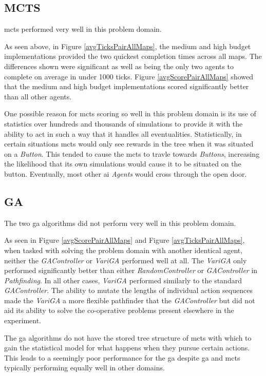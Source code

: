 \documentclass{IEEEtran}
\begin{document}
\subsection{MCTS}
\gls{mcts} performed very well in this problem domain. 

As seen above, in Figure \ref{avgTicksPairAllMaps}, the medium and high budget implementations provided the two quickest completion times across all maps. The differences shown were significant as well as being the only two agents to complete on average in under 1000 ticks.  Figure \ref{avgScorePairAllMaps} showed that the medium and high budget implementations scored significantly better than all other agents.

One possible reason for \gls{mcts} scoring so well in this problem domain is its use of statistics over hundreds and thousands of simulations to provide it with the ability to act in such a way that it handles all eventualities. Statistically,  in certain situations \gls{mcts} would only see rewards in the tree when it was situated on a \emph{Button}. This tended to cause the \gls{mcts} to travle towards \emph{Buttons}, increasing the likelihood that its own simulations would cause it to be situated on the button. Eventually, most other \gls{ai} \emph{Agents} would cross through the open door.
\subsection{GA}
The two \gls{ga} algorithms did not perform very well in this problem domain. 

As seen in Figure \ref{avgScorePairAllMaps} and Figure \ref{avgTicksPairAllMaps}, when tasked with solving the problem domain with another identical agent, neither the \emph{GAController} or \emph{VariGA} performed well at all. The \emph{VariGA} only performed significantly better than either \emph{RandomController} or \emph{GAController} in \emph{Pathfinding}. In all other cases, \emph{VariGA} performed similarly to the standard \emph{GAController}. The ability to mutate the lengths of individual action sequences made the \emph{VariGA} a more flexible pathfinder that the \emph{GAController} but did not aid its ability to solve the co-operative problems present elsewhere in the experiment.

The \gls{ga} algorithms do not have the stored tree structure of \gls{mcts} with which to gain the statistical model for what happens when they pursue certain actions. This leads to a seemingly poor performance for the \gls{ga} despite \gls{ga} and \gls{mcts} typically performing equally well in other domains.
\end{document}
